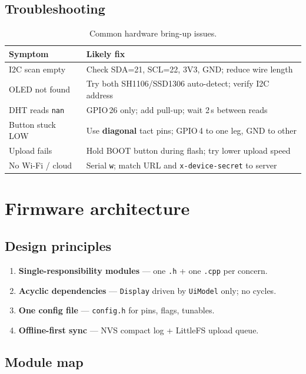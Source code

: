 \documentclass[11pt,a4paper]{report}
\newcommand{\filepath}[1]{\texttt{#1}}
\begin{document}
\section{Troubleshooting}

\begin{table}[h]
\centering
\caption{Common hardware bring-up issues.}
\begin{tabular}{@{}p{4cm}p{8.8cm}@{}}
\toprule
\textbf{Symptom} & \textbf{Likely fix} \\
\midrule
I2C scan empty & Check SDA=21, SCL=22, 3V3, GND; reduce wire length \\
OLED not found & Try both SH1106/SSD1306 auto-detect; verify I2C address \\
DHT reads \texttt{nan} & GPIO\,26 only; add pull-up; wait 2\,s between reads \\
Button stuck LOW & Use \textbf{diagonal} tact pins; GPIO\,4 to one leg, GND to other \\
Upload fails & Hold BOOT button during flash; try lower upload speed \\
No Wi-Fi / cloud & Serial \texttt{w}; match URL and \texttt{x-device-secret} to server \\
\bottomrule
\end{tabular}
\end{table}

\chapter{Firmware architecture}

\section{Design principles}

\begin{enumerate}[leftmargin=*]
  \item \textbf{Single-responsibility modules} --- one \filepath{.h} + one \filepath{.cpp} per concern.
  \item \textbf{Acyclic dependencies} --- \filepath{Display} driven by \texttt{UiModel} only; no cycles.
  \item \textbf{One config file} --- \filepath{config.h} for pins, flags, tunables.
  \item \textbf{Offline-first sync} --- NVS compact log + LittleFS upload queue.
\end{enumerate}

\section{Module map}
\end{document}

